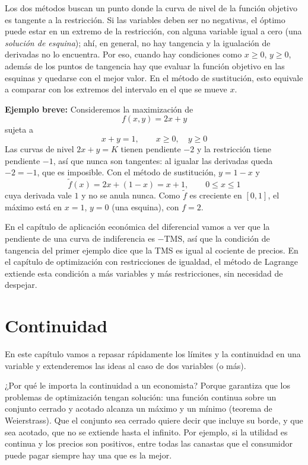 \documentclass{article}
\begin{document}
Los dos métodos buscan un punto donde la curva de nivel de la función objetivo es tangente a la restricción. Si las variables deben ser no negativas, el óptimo puede estar en un extremo de la restricción, con alguna variable igual a cero (una \emph{solución de esquina}); ahí, en general, no hay tangencia y la igualación de derivadas no lo encuentra. Por eso, {\color{teal}cuando hay condiciones como \(x\geq 0\), \(y\geq 0\), además de los puntos de tangencia hay que evaluar la función objetivo en las esquinas y quedarse con el mejor valor}. En el método de sustitución, esto equivale a comparar con los extremos del intervalo en el que se mueve \(x\).
 
\medskip
 
\textbf{Ejemplo breve:}
Consideremos la maximización de
\[
f(x,y)=2x+y
\]
sujeta a
\[
x+y=1,\qquad x\geq 0,\quad y\geq 0
\]
Las curvas de nivel \(2x+y=K\) tienen pendiente \(-2\) y la restricción tiene pendiente \(-1\), así que nunca son tangentes: al igualar las derivadas queda \(-2=-1\), que es imposible. Con el método de sustitución, \(y=1-x\) y
\[
\tilde f(x)=2x+(1-x)=x+1,\qquad 0\leq x\leq 1
\]
cuya derivada vale \(1\) y no se anula nunca. Como \(\tilde f\) es creciente en \([0,1]\), {\color{teal}el máximo está en \(x=1\), \(y=0\) (una esquina), con \(f=2\)}.
 
\medskip
 
 En el capítulo de aplicación económica del diferencial vamos a ver que la pendiente de una curva de indiferencia es \(-\text{TMS}\), así que la condición de tangencia del primer ejemplo dice que la TMS es igual al cociente de precios. En el capítulo de optimización con restricciones de igualdad, el método de Lagrange extiende esta condición a más variables y más restricciones, sin necesidad de despejar.

\newpage


\section{Continuidad}

En este capítulo vamos a repasar rápidamente los {\color{teal}límites y la continuidad en una variable} y extenderemos las ideas al caso de {\color{teal}dos variables} (o más).

¿Por qué le importa la continuidad a un economista? Porque garantiza que los problemas de optimización tengan solución: {\color{teal}una función continua sobre un conjunto cerrado y acotado alcanza un máximo y un mínimo} (teorema de Weierstrass). Que el conjunto sea cerrado quiere decir que incluye su borde, y que sea acotado, que no se extiende hasta el infinito. Por ejemplo, si la utilidad es continua y los precios son positivos, entre todas las canastas que el consumidor puede pagar siempre hay una que es la mejor.
\end{document}
